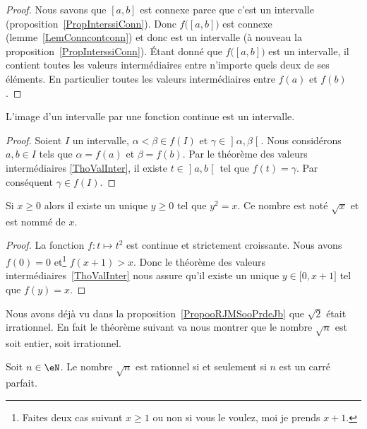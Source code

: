 \begin{proof}
Nous savons que $[a,b]$ est connexe parce que c'est un intervalle (proposition~\ref{PropInterssiConn}). Donc $f\big( [a,b] \big)$ est connexe (lemme~\ref{LemConncontconn}) et donc est un intervalle (à nouveau la proposition~\ref{PropInterssiConn}). Étant donné que $f\big( [a,b] \big)$ est un intervalle, il contient toutes les valeurs intermédiaires entre n'importe quels deux de ses éléments. En particulier toutes les valeurs intermédiaires entre $f(a)$ et $f(b)$.
\end{proof}

\begin{corollary}       \label{CorImInterInter}
L'image d'un intervalle par une fonction continue est un intervalle.
\end{corollary}

\begin{proof}
Soient \( I\) un intervalle, \( \alpha<\beta\in f(I)\) et \( \gamma\in\mathopen] \alpha , \beta \mathclose[\). Nous considérons \(a,b\in I\) tels que \( \alpha=f(a)\) et \( \beta=f(b)\). Par le théorème des valeurs intermédiaires \ref{ThoValInter}, il existe \( t\in\mathopen] a , b \mathclose[\) tel que \( f(t)=\gamma\). Par conséquent \( \gamma\in f(I)\).
\end{proof}

\begin{corollaryDef}
    Si \( x\geq 0\) alors il existe un unique \( y\geq 0\) tel que \( y^2=x\). Ce nombre est noté \( \sqrt{x}\) et est nommé  de \( x\).
\end{corollaryDef}

\begin{proof}
    La fonction \( f\colon t\mapsto t^2\) est continue et strictement croissante. Nous avons \( f(0)=0\) et\footnote{Faites deux cas suivant \( x\geq 1\) ou non si vous le voulez, moi je prends \( x+1\).} \( f(x+1)>x\). Donc le théorème des valeurs intermédiaires~\ref{ThoValInter} nous assure qu'il existe un unique \( y\in\mathopen[ 0 , x+1 \mathclose]\) tel que \( f(y)=x\).
\end{proof}

Nous avons déjà vu dans la proposition~\ref{PropooRJMSooPrdeJb} que \( \sqrt{2}\) était irrationnel. En fait le théorème suivant va nous montrer que le nombre \( \sqrt{ n }\) est soit entier, soit irrationnel.
\begin{theorem}     \label{THOooYXJIooWcbnbm}
    Soit \( n\in \eN\). Le nombre \( \sqrt{n}\) est rationnel si et seulement si \( n\) est un carré parfait.
\end{theorem}

